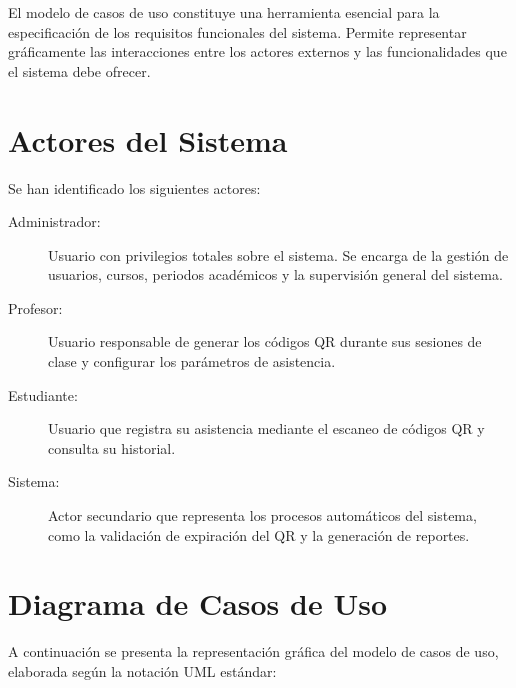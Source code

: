 \documentclass[12pt, letterpaper, oneside]{report}
\begin{document}
El modelo de casos de uso constituye una herramienta esencial para la especificaci\'on de los requisitos funcionales del sistema. Permite representar gr\'aficamente las interacciones entre los actores externos y las funcionalidades que el sistema debe ofrecer.

\section{Actores del Sistema}

Se han identificado los siguientes actores:

\begin{description}
  \item[Administrador:] Usuario con privilegios totales sobre el sistema. Se encarga de la gesti\'on de usuarios, cursos, periodos acad\'emicos y la supervisi\'on general del sistema.
  \item[Profesor:] Usuario responsable de generar los c\'odigos QR durante sus sesiones de clase y configurar los par\'ametros de asistencia.
  \item[Estudiante:] Usuario que registra su asistencia mediante el escaneo de c\'odigos QR y consulta su historial.
  \item[Sistema:] Actor secundario que representa los procesos autom\'aticos del sistema, como la validaci\'on de expiraci\'on del QR y la generaci\'on de reportes.
\end{description}

\section{Diagrama de Casos de Uso}

A continuaci\'on se presenta la representaci\'on gr\'afica del modelo de casos de uso, elaborada seg\'un la notaci\'on UML est\'andar:
\end{document}
